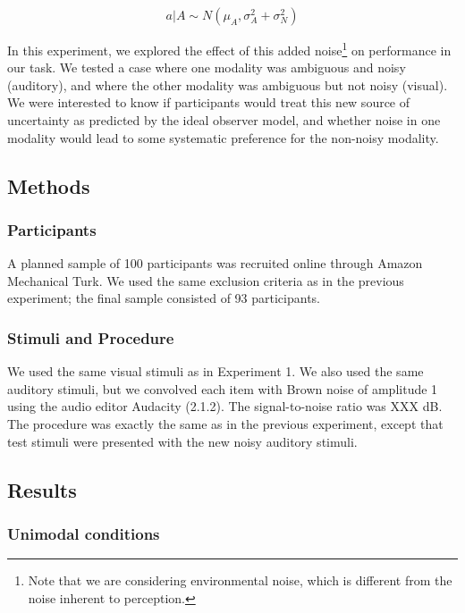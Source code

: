 \documentclass[10pt,letterpaper]{article}
\begin{document}
\begin{equation}
a | A \sim N(\mu_{A}, \sigma^2_{A}+\sigma^2_{N})
\end{equation}

In this experiment, we explored the effect of this added noise\footnote{Note that we are considering environmental noise, which is different from the noise inherent to perception.} on performance in our task. We tested a case where one modality was ambiguous and noisy (auditory), and where the other modality was ambiguous but not noisy (visual). We were interested to know if participants would treat this new source of uncertainty as predicted by the ideal observer model, and whether noise in one modality would lead to some systematic preference for the non-noisy modality.

\subsection{Methods}

\subsubsection{Participants}

A planned sample of 100 participants was recruited online through Amazon Mechanical Turk. We used the same exclusion criteria as in the previous experiment; the final sample consisted of 93 participants.

\subsubsection{Stimuli and Procedure}

We used the same visual stimuli as in Experiment 1. We also used the same auditory stimuli, but we convolved each item with Brown noise of amplitude 1 using the audio editor Audacity (2.1.2).  The signal-to-noise ratio was XXX dB. The procedure was exactly the same as in the previous experiment, except that test stimuli were presented with the new noisy auditory stimuli.

\subsection{Results}

\subsubsection{Unimodal conditions}
\end{document}
